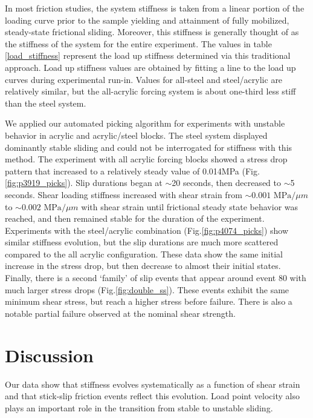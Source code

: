 In most friction studies, the system stiffness is taken from a linear portion of
the loading curve prior to the sample yielding and attainment of fully
mobilized, steady-state frictional sliding.  Moreover, this stiffness is
generally thought of as the stiffness of the system for the entire experiment.
The values in table \ref{load_stiffness} represent the load up stiffness
determined via this traditional approach.  Load up stiffness values are obtained
by fitting a line to the load up curves during experimental run-in.  Values for
all-steel and steel/acrylic are relatively similar, but the all-acrylic forcing
system is about one-third less stiff than the steel system.

We applied our automated picking algorithm for experiments with unstable
behavior in acrylic and acrylic/steel blocks.  The steel system displayed
dominantly stable sliding and could not be interrogated for stiffness with this
method.  The experiment with all acrylic forcing blocks showed a stress drop
pattern that increased to a relatively steady value of 0.014MPa
(Fig.\ref{fig:p3919_picks}).  Slip durations began at $\sim$20 seconds, then
decreased to $\sim$5 seconds.  Shear loading stiffness increased with shear
strain from $\sim 0.001 \text{ MPa}/\mu m$ to $\sim 0.002 \text{ MPa}/\mu m$
with shear strain until frictional steady state behavior was reached, and then
remained stable for the duration of the experiment.  Experiments with the
steel/acrylic combination (Fig.\ref{fig:p4074_picks}) show similar stiffness
evolution, but the slip durations are much more scattered compared to the all
acrylic configuration.  These data show the same initial increase in the stress
drop, but then decrease to almost their initial states.  Finally, there is a
second `family' of slip events that appear around event 80 with much larger
stress drops (Fig.\ref{fig:double_ss}).  These events exhibit the same minimum
shear stress, but reach a higher stress before failure.  There is also a notable
partial failure observed at the nominal shear strength.

\section{Discussion}

Our data show that stiffness evolves systematically as a function of shear
strain and that stick-slip friction events reflect this evolution.  Load point
velocity also plays an important role in the transition from stable to unstable
sliding.

